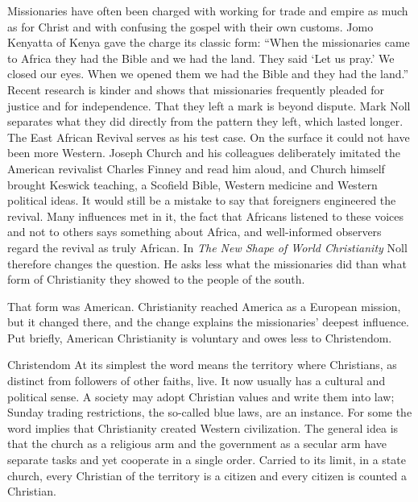 Missionaries have often been charged with working for trade and empire as much as for Christ and
with confusing the gospel with their own customs. Jomo Kenyatta of Kenya gave the charge its classic
form: ``When the missionaries came to Africa they had the Bible and we had the land. They said `Let
us pray.' We closed our eyes. When we opened them we had the Bible and they had the land.'' Recent
research is kinder and shows that missionaries frequently pleaded for justice and for independence.
That they left a mark is beyond dispute. Mark Noll separates what they did directly from the pattern
they left, which lasted longer. The East African Revival serves as his test case. On the surface it
could not have been more Western. Joseph Church and his colleagues deliberately imitated the American
revivalist Charles Finney and read him aloud, and Church himself brought Keswick teaching, a Scofield
Bible, Western medicine and Western political ideas. It would still be a mistake to say that
foreigners engineered the revival. Many influences met in it, the fact that Africans listened to
these voices and not to others says something about Africa, and well-informed observers regard the
revival as truly African. In \emph{The New Shape of World Christianity} Noll therefore changes the
question. He asks less what the missionaries did than what form of Christianity they showed to the
people of the south.

That form was American. Christianity reached America as a European mission, but it changed there, and
the change explains the missionaries' deepest influence. Put briefly, American Christianity is
voluntary and owes less to Christendom.

\begin{sidebox}{Christendom}
At its simplest the word means the territory where Christians, as distinct from followers of other
faiths, live. It now usually has a cultural and political sense. A society may adopt Christian values
and write them into law; Sunday trading restrictions, the so-called blue laws, are an instance. For
some the word implies that Christianity created Western civilization. The general idea is that the
church as a religious arm and the government as a secular arm have separate tasks and yet cooperate
in a single order. Carried to its limit, in a state church, every Christian of the territory is a
citizen and every citizen is counted a Christian.
\end{sidebox}

